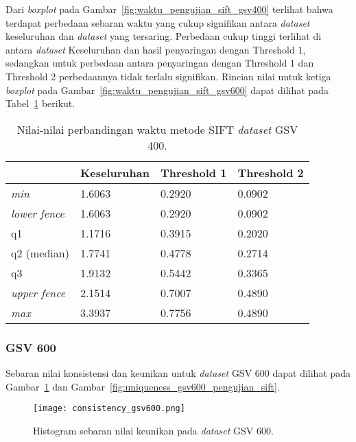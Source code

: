 Dari \textit{boxplot} pada Gambar~\ref{fig:waktu_pengujian_sift_gsv400} terlihat bahwa terdapat perbedaan sebaran waktu yang cukup signifikan antara \textit{dataset} keseluruhan dan \textit{dataset} yang tersaring. Perbedaan cukup tinggi terlihat di antara \textit{dataset} Keseluruhan dan hasil penyaringan dengan Threshold 1, sedangkan untuk perbedaan antara penyaringan dengan Threshold 1 dan Threshold 2 perbedaannya tidak terlalu signifikan. Rincian nilai untuk ketiga \textit{boxplot} pada Gambar~\ref{fig:waktu_pengujian_sift_gsv600} dapat dilihat pada Tabel~\ref{tab:boxplot_gsv400_sift} berikut.
\begin{table}[H]
	\centering
	\begin{tabular}{|l|l|l|l|}
		\hline
		& \textbf{Keseluruhan} & \textbf{Threshold 1} & \textbf{Threshold 2} \\ \hline
		\textit{min}          & 1.6063 & 0.2920 & 0.0902              \\ \hline
		\textit{lower fence}  & 1.6063 & 0.2920 & 0.0902              \\ \hline
		q1                    & 1.1716 & 0.3915 & 0.2020              \\ \hline
		q2 (median)           & 1.7741 & 0.4778 & 0.2714              \\ \hline
		q3                    & 1.9132 & 0.5442 & 0.3365              \\ \hline
		\textit{upper fence}  & 2.1514 & 0.7007 & 0.4890              \\ \hline
		\textit{max}          & 3.3937 & 0.7756 & 0.4890              \\ \hline
	\end{tabular}
	\caption{Nilai-nilai perbandingan waktu metode SIFT \textit{dataset} GSV 400.}
	\label{tab:boxplot_gsv400_sift}
\end{table}

\subsubsection{GSV 600}
Sebaran nilai konsistensi dan keunikan untuk \textit{dataset} GSV 600 dapat dilihat pada Gambar~\ref{fig:consistency_gsv600_pengujian_sift} dan Gambar~\ref{fig:uniqueness_gsv600_pengujian_sift}.
\begin{figure}[H]
	\centering
	\texttt{[image: consistency\_gsv600.png]}
	\caption{Histogram sebaran nilai keunikan pada \textit{dataset} GSV 600.}
	\label{fig:consistency_gsv600_pengujian_sift}
\end{figure}

